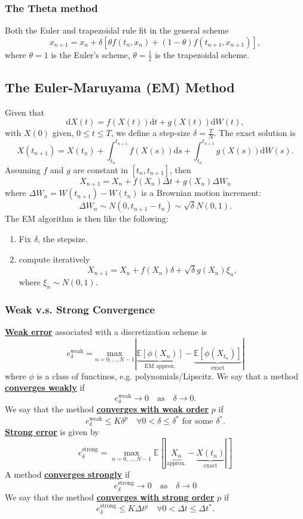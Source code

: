 \documentclass[twocolumn,landscape,10pt]{article}
\theoremstyle{definition}
\begin{document}
\subsubsection{The Theta method}

Both the Euler and trapezoidal rule fit in the general scheme
\[
    x_{n+1}=x_n+\delta\left[\theta
    f(t_n,x_n)+(1-\theta)f(t_{n+1},x_{n+1})\right],
\]
where $\theta=1$ is the Euler's scheme, $\theta=\frac{1}{2}$ is the trapezoidal
scheme.

\subsection{The Euler-Maruyama (EM) Method}

Given that
\[
    \mathrm{d}X(t)=f(X(t))\mathrm{d}t+g(X(t))\mathrm{d}W(t),
\]
with $X(0)$ given, $0\le t\le T$, we define a step-size $\delta=\frac{T}{N}$.
The exact solution is
\[
    X(t_{n+1})=X(t_n)+\int_{t_n}^{t_{n+1}}f(X(s))\mathrm{d}s+\int_{t_n}^{t_{n+1}}g(X(s))\mathrm{d}W(s).
\]
Assuming $f$ and $g$ are constant in $[t_n,t_{n+1}]$, then
\[
    X_{n+1}=X_n+f(X_n)\Delta t + g(X_n)\Delta W_n
\]
where $\Delta W_n=W(t_{n+1})-W(t_n)$ is a Brownian motion increment:
\[
    \Delta W_n\sim N(0,t_{n+1}-t_n)\sim\sqrt{\delta}N(0,1).
\]
The EM algorithm is then like the following:
\begin{enumerate}
    \item Fix $\delta$, the stepsize.
    \item compute iteratively
        \[
            X_{n+1}=X_n+f(X_n)\delta + \sqrt{\delta}g(X_n)\xi_n,
        \]
        where $\xi_n\sim N(0,1)$.
\end{enumerate}

\subsubsection{Weak v.s. Strong Convergence}

\textbf{\underline{Weak error}} associated with a discretization scheme is
\[
    e^\text{weak}_\delta=\underset{n=0,\ldots,N-1}{\text{max}}
    |\underbrace{\mathbb{E}[\phi(X_n)]}_{\text{EM
    approx.}}-\underbrace{\mathbb{E}[\phi(X_{t_n})]}_{\text{exact}}|
\]
where $\phi$ is a class of functinos, e.g. polynomials/Lipscitz.
We say that a method \textbf{\underline{converges weakly}} if
\[
    e^\text{weak}_\delta\longrightarrow
    0\quad\text{as}\quad\delta\longrightarrow 0.
\]
We say that the method \textbf{\underline{converges with weak order}} $p$ if
\[
    e^\text{weak}_\delta\le K\delta^p\quad
    \forall 0<\delta\le\delta^*\text{ for some $\delta^*$}.
\]
\textbf{\underline{Strong error}} is given by
\[
    e^\text{strong}_\delta=\underset{n=0,\ldots,N-1}{\max}\mathbb{E}[
    |\underbrace{X_n}_{\text{approx.}}-\underbrace{X(t_n)}_{\text{exact}}|]
\]
A method \textbf{\underline{converges strongly}} if
\[
    e^\text{strong}_\delta\longrightarrow
    0\quad\text{as}\quad\delta\longrightarrow 0
\]
We say that the method \textbf{\underline{converges with strong order}} $p$ if
\[
    e^\text{strong}_\delta\le K\Delta t^p\quad
    \forall 0<\Delta t\le\Delta t^*.
\]
\end{document}
